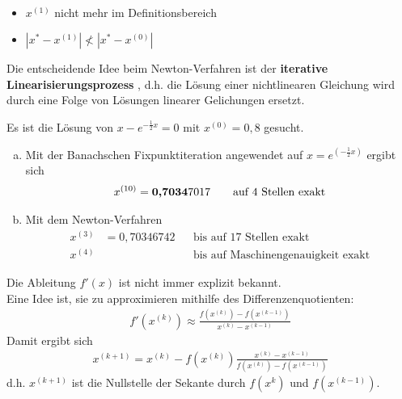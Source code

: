 
\begin{Bspe}~
	\begin{itemize}
		\item $x^{(1)}$ nicht mehr im Definitionsbereich
		\item $|x^{*}-x^{(1)}| \nless |x^{*}-x^{(0)}| $
	\end{itemize}
\end{Bspe}

Die entscheidende Idee beim Newton-Verfahren ist der \textbf{iterative Linearisierungsprozess}
, d.h. die Lösung einer nichtlinearen Gleichung wird
durch eine Folge von Lösungen linearer Gelichungen ersetzt.

\begin{Bspe}
	\label{5.4.6}
	Es ist die Lösung von $x-e^{-\frac{1}{2}x}=0$ mit $x^{(0)}=0,8$ gesucht.
	\begin{enumerate}[a)]
		\item Mit der Banachschen Fixpunktiteration angewendet auf 
		$x=e^{(-\frac{1}{2}x)}$ ergibt sich
		\begin{gather*}
		x^{(10)}=\text{\textbf{0,7034}}7017 
		\qquad \text{auf 4 Stellen exakt}
		\end{gather*}
		\item Mit dem Newton-Verfahren
		\begin{align*}
		x^{(3)}&= 0,70346742 &&\text{bis auf 17 Stellen exakt}\\
		x^{(4)} &&& \text{bis auf Maschinengenauigkeit exakt}
		\end{align*}		
	\end{enumerate}
\end{Bspe}
Die Ableitung $f'(x)$ ist nicht immer explizit bekannt. \\
Eine Idee ist, sie zu approximieren mithilfe des Differenzenquotienten:
\begin{gather*}
f'(x^{(k)})  \approx \frac{f(x^{(k)})-f(x^{(k-1)})}{x^{(k)}-x^{(k-1)}}
\end{gather*}
Damit ergibt sich
\begin{gather*}
x^{(k+1)} = x^{(k)}-f(x^{(k)}) \frac{x^{(k)} - x^{(k-1)}}{f(x^{(k)})-f(x^{(k-1)})}
\end{gather*}
d.h. $x^{(k+1)} $ ist die Nullstelle der Sekante durch $f(x^{k})$ und $f(x^{(k-1)})$.


